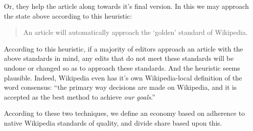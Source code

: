 Or, they help the article along towards it's final version. In this we
may approach the state above according to this heuristic:

\begin{quote}
  An article will automatically approach the `golden' standard of
  Wikipedia.
\end{quote}

According to this heuristic, if a majority of editors approach an
article with the above standards in mind, any edits that do not meet
these standards will be undone or changed so as to approach these
standards. And the heuristic seems plausible. Indeed, Wikipedia even
has it's own Wikipedia-local definition of the word consensus: ``the
primary way decisions are made on Wikipedia, and it is accepted as the
best method to achieve \textit{our goals}.''\cite{wiki-consensus}

According to these two techniques, we define an economy based on
adherence to native Wikipedia standards of quality, and divide share
based upon this. 
